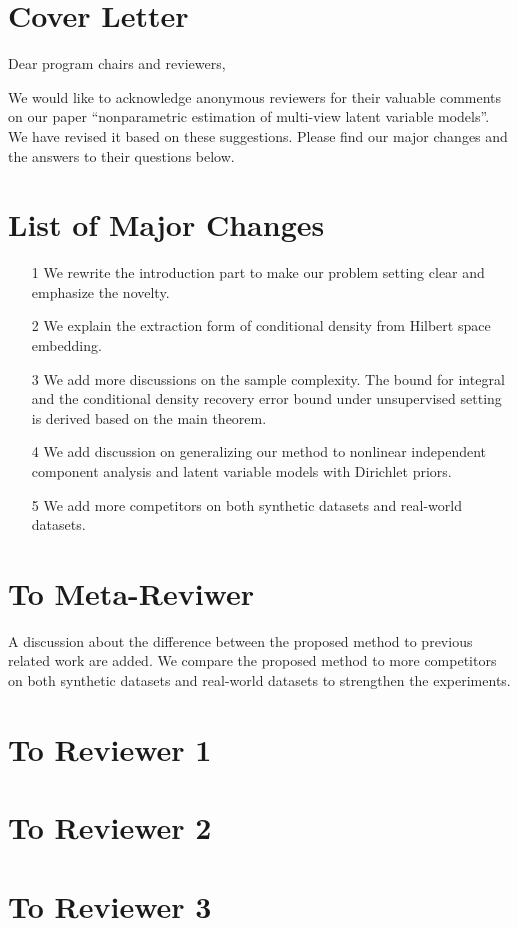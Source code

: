 \documentclass{article}
\begin{document}
\section*{Cover Letter}

Dear program chairs and reviewers,

We would like to acknowledge anonymous reviewers for their valuable comments on our paper ``nonparametric estimation of multi-view latent variable models''. We have revised it based on these suggestions. Please find our major changes and the answers to their questions below.


\section*{List of Major Changes}

\begin{itemize}
\item[1] We rewrite the introduction part to make our problem setting clear and emphasize the novelty.
\item[2] We explain the extraction form of conditional density from Hilbert space embedding.
\item[3] We add more discussions on the sample complexity. The bound for integral and the conditional density recovery error bound under unsupervised setting is derived based on the main theorem.
\item[4] We add discussion on generalizing our method to nonlinear independent component analysis and latent variable models with Dirichlet priors.
\item[5] We add more competitors on both synthetic datasets and real-world datasets.
\end{itemize}

\section*{To Meta-Reviwer}
A discussion about the difference between the proposed method to previous related work are added. We compare the proposed method to more competitors on both synthetic datasets and real-world datasets to strengthen the experiments. 
\section*{To Reviewer 1}
\section*{To Reviewer 2}
\section*{To Reviewer 3}
\end{document}
